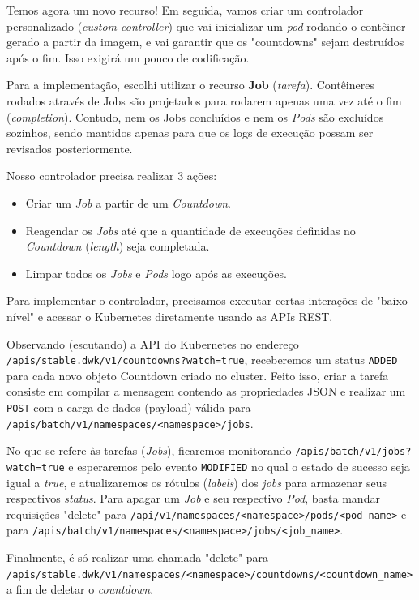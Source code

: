 \documentclass[11pt,a4paper]{article}
\begin{document}
Temos agora um novo recurso! Em seguida, vamos criar um controlador personalizado (\textit{custom controller}) que vai inicializar um \textit{pod} rodando o contêiner gerado a partir da imagem, e vai garantir que os "countdowns" sejam destruídos após o fim. Isso exigirá um pouco de codificação.

Para a implementação, escolhi utilizar o recurso \textbf{Job} (\textit{tarefa}). Contêineres rodados através de Jobs são projetados para rodarem apenas uma vez até o fim (\textit{completion}). Contudo, nem os Jobs concluídos e nem os \textit{Pods} são excluídos sozinhos, sendo mantidos apenas para que os logs de execução possam ser revisados posteriormente.

Nosso controlador precisa realizar 3 ações:
\begin{itemize}
    \item Criar um \textit{Job} a partir de um \textit{Countdown}.
    \item Reagendar os \textit{Jobs} até que a quantidade de execuções definidas no \textit{Countdown} (\textit{length}) seja completada.
    \item Limpar todos os \textit{Jobs} e \textit{Pods} logo após as execuções.
\end{itemize}

Para implementar o controlador, precisamos executar certas interações de "baixo nível" e acessar o Kubernetes diretamente usando as APIs REST.

Observando (escutando) a API do Kubernetes no endereço \texttt{/apis/stable.dwk/v1/countdowns?watch=true}, receberemos um status \texttt{ADDED} para cada novo objeto Countdown criado no cluster. Feito isso, criar a tarefa consiste em compilar a mensagem contendo as propriedades JSON e realizar um \texttt{POST} com a carga de dados (payload) válida para \texttt{/apis/batch/v1/namespaces/<namespace>/jobs}.

No que se refere às tarefas (\textit{Jobs}), ficaremos monitorando \texttt{/apis/batch/v1/jobs?watch=true} e esperaremos pelo evento \texttt{MODIFIED} no qual o estado de sucesso seja igual a \textit{true}, e atualizaremos os rótulos (\textit{labels}) dos \textit{jobs} para armazenar seus respectivos \textit{status}. Para apagar um \textit{Job} e seu respectivo \textit{Pod}, basta mandar requisições "delete" para \texttt{/api/v1/namespaces/<namespace>/pods/<pod\_name>} e para \texttt{/apis/batch/v1/namespaces/<namespace>/jobs/<job\_name>}.

Finalmente, é só realizar uma chamada "delete" para \texttt{/apis/stable.dwk/v1/namespaces/<namespace>/countdowns/<countdown\_name>} a fim de deletar o \textit{countdown}.
\end{document}
